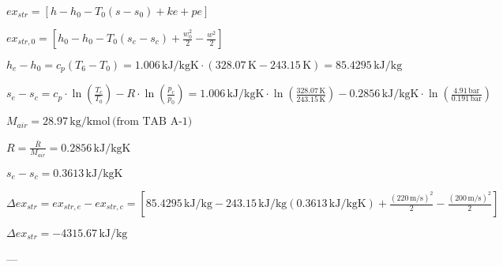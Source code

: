\( ex_{str} = [ h - h_0 - T_0 (s - s_0) + ke + pe ] \)  

\( ex_{str,0} = [ h_0 - h_0 - T_0 (s_e - s_c) + \frac{w_0^2}{2} - \frac{w^2}{2} ] \)  

\( h_e - h_0 = c_p (T_6 - T_0) = 1.006 \, \text{kJ/kgK} \cdot (328.07 \, \text{K} - 243.15 \, \text{K}) = 85.4295 \, \text{kJ/kg} \)  

\( s_e - s_c = c_p \cdot \ln \left( \frac{T_c}{T_0} \right) - R \cdot \ln \left( \frac{p_c}{p_0} \right) = 1.006 \, \text{kJ/kgK} \cdot \ln \left( \frac{328.07 \, \text{K}}{243.15 \, \text{K}} \right) - 0.2856 \, \text{kJ/kgK} \cdot \ln \left( \frac{4.91 \, \text{bar}}{0.191 \, \text{bar}} \right) \)  

\( M_{air} = 28.97 \, \text{kg/kmol} \, \text{(from TAB A-1)} \)  

\( R = \frac{\bar{R}}{M_{air}} = 0.2856 \, \text{kJ/kgK} \)  

\( s_e - s_c = 0.3613 \, \text{kJ/kgK} \)  

\( \Delta ex_{str} = ex_{str,e} - ex_{str,c} = [ 85.4295 \, \text{kJ/kg} - 243.15 \, \text{kJ/kg} (0.3613 \, \text{kJ/kgK}) + \frac{(220 \, \text{m/s})^2}{2} - \frac{(200 \, \text{m/s})^2}{2} ] \)  

\( \Delta ex_{str} = -4315.67 \, \text{kJ/kg} \)  

---